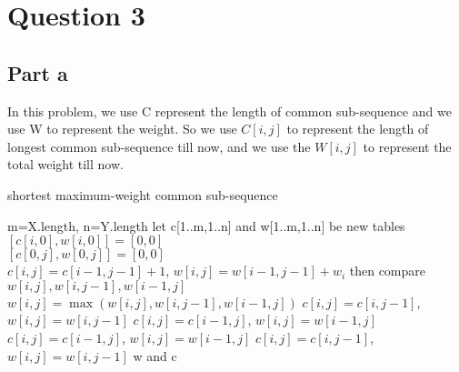 \documentclass[paper=a4, fontsize=11pt]{scrartcl} %
\numberwithin{equation}{section} %
\numberwithin{figure}{section} %
\numberwithin{table}{section} %
\begin{document}
\vspace{13cm}
\section{\textbf{Question 3}}
\subsection{\textbf{Part a}}
In this problem, we use C represent the length of common sub-sequence and we use W to represent the weight. So we use $C[i,j]$ to represent the length of longest common sub-sequence till now, and we use the $W[i,j]$ to represent the total weight till now.\\
\begin{algorithm}
  \caption{shortest maximum-weight common sub-sequence}
  \begin{algorithmic}
  \STATE m=X.length, n=Y.length
  \STATE let c[1..m,1..n] and w[1..m,1..n] be new tables
  \STATE $[c[i,0],w[i,0]]=[0,0]$\\
  \ENDFOR
  \STATE $[c[0,j],w[0,j]]=[0,0]$\\
  \ENDFOR
        \STATE $c[i,j]=c[i-1,j-1]+1$, $w[i,j]=w[i-1,j-1]+w_i$
        \STATE then compare $w[i,j],w[i,j-1],w[i-1,j]$
        \STATE $w[i,j]=\max{(w[i,j],w[i,j-1],w[i-1,j])}$
        \STATE $c[i,j]=c[i,j-1]$, $w[i,j]=w[i,j-1]$
        \STATE $c[i,j]=c[i-1,j]$, $w[i,j]=w[i-1,j]$
            \STATE $c[i,j]=c[i-1,j]$, $w[i,j]=w[i-1,j]$
         \ELSE
            \STATE $c[i,j]=c[i,j-1]$, $w[i,j]=w[i,j-1]$
         \ENDIF
    \ENDIF
    \ENDFOR
  \ENDFOR
  \RETURN w and c
  \end{algorithmic}
\end{algorithm}
\end{document}
